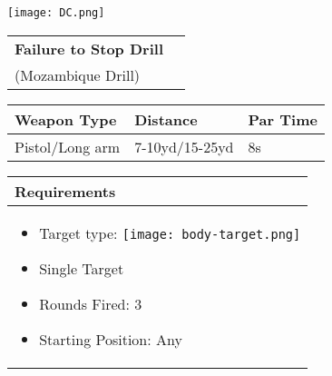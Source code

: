 \documentclass[../Cover.tex]{subfiles}
\begin{document}
	\begin{minipage}[t][0.2\textheight][t]{0.1\textwidth} 
		\texttt{[image: DC.png]}
	\end{minipage}
	\hfill
	\begin{minipage}[t][0.2\textheight][t]{0.8\textwidth}
		\begin{tabular}{ p{} l  }		
			\\	
			\textbf{Failure to Stop Drill} \\
			\tiny (Mozambique Drill)\\[0.09\textheight]
		\end{tabular}
		\quad
		\begin{tabular}{ | p{} | p{} | p{} |}
			\hline
			\rowcolor[HTML]{C0C0C0}\tiny Weapon Type & \tiny Distance & \tiny Par Time\\ 
			\hline
			\tiny Pistol/Long arm & \tiny 7-10yd/15-25yd & \tiny 8s \\ %
			\hline
		\end{tabular}
	\end{minipage}
	\begin{tabular}{p{}}
		\small Requirements \\
		\hline
		\tiny \begin{itemize}
			\item Target type: \texttt{[image: body-target.png]}
			\item Single Target
			\item Rounds Fired: 3
			\item Starting Position: Any
		\end{itemize}				
		\\[0.6\textheight]
	\end{tabular}
\end{document}
